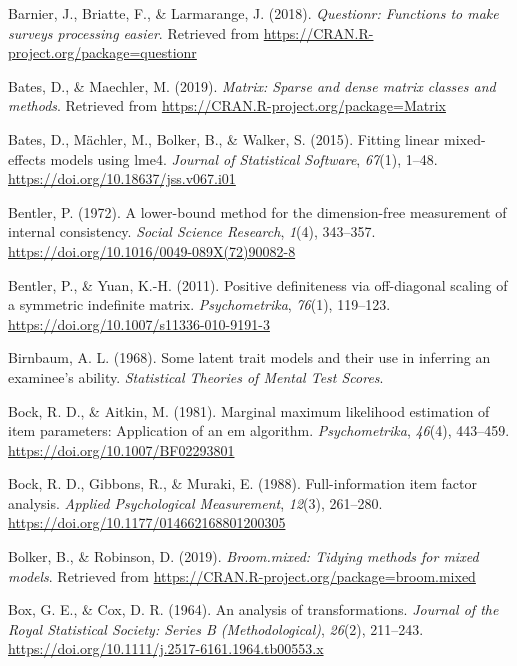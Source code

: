 \documentclass[
  english,
  man]{apa6}
\begin{document}
\leavevmode\hypertarget{ref-R-questionr}{}%
Barnier, J., Briatte, F., \& Larmarange, J. (2018). \emph{Questionr: Functions to make surveys processing easier}. Retrieved from \url{https://CRAN.R-project.org/package=questionr}

\leavevmode\hypertarget{ref-R-Matrix}{}%
Bates, D., \& Maechler, M. (2019). \emph{Matrix: Sparse and dense matrix classes and methods}. Retrieved from \url{https://CRAN.R-project.org/package=Matrix}

\leavevmode\hypertarget{ref-R-lme4}{}%
Bates, D., Mächler, M., Bolker, B., \& Walker, S. (2015). Fitting linear mixed-effects models using lme4. \emph{Journal of Statistical Software}, \emph{67}(1), 1--48. \url{https://doi.org/10.18637/jss.v067.i01}

\leavevmode\hypertarget{ref-bentler1972}{}%
Bentler, P. (1972). A lower-bound method for the dimension-free measurement of internal consistency. \emph{Social Science Research}, \emph{1}(4), 343--357. \url{https://doi.org/10.1016/0049-089X(72)90082-8}

\leavevmode\hypertarget{ref-bentler2011}{}%
Bentler, P., \& Yuan, K.-H. (2011). Positive definiteness via off-diagonal scaling of a symmetric indefinite matrix. \emph{Psychometrika}, \emph{76}(1), 119--123. \url{https://doi.org/10.1007/s11336-010-9191-3}

\leavevmode\hypertarget{ref-birnbaum1968some}{}%
Birnbaum, A. L. (1968). Some latent trait models and their use in inferring an examinee's ability. \emph{Statistical Theories of Mental Test Scores}.

\leavevmode\hypertarget{ref-bock1981}{}%
Bock, R. D., \& Aitkin, M. (1981). Marginal maximum likelihood estimation of item parameters: Application of an em algorithm. \emph{Psychometrika}, \emph{46}(4), 443--459. \url{https://doi.org/10.1007/BF02293801}

\leavevmode\hypertarget{ref-bock1988}{}%
Bock, R. D., Gibbons, R., \& Muraki, E. (1988). Full-information item factor analysis. \emph{Applied Psychological Measurement}, \emph{12}(3), 261--280. \url{https://doi.org/10.1177/014662168801200305}

\leavevmode\hypertarget{ref-R-broom.mixed}{}%
Bolker, B., \& Robinson, D. (2019). \emph{Broom.mixed: Tidying methods for mixed models}. Retrieved from \url{https://CRAN.R-project.org/package=broom.mixed}

\leavevmode\hypertarget{ref-box1964}{}%
Box, G. E., \& Cox, D. R. (1964). An analysis of transformations. \emph{Journal of the Royal Statistical Society: Series B (Methodological)}, \emph{26}(2), 211--243. \url{https://doi.org/10.1111/j.2517-6161.1964.tb00553.x}
\end{document}
